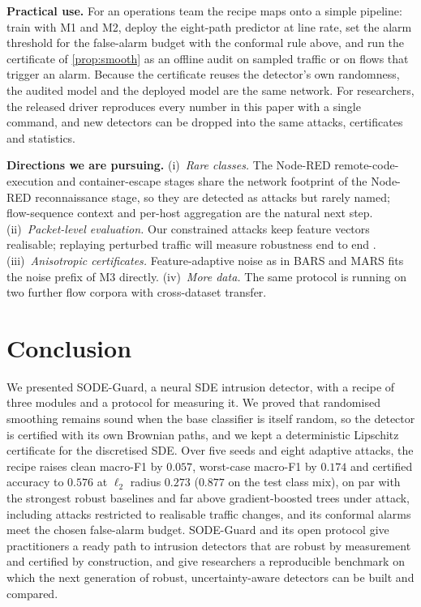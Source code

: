 \documentclass{article}
\theoremstyle{definition}
\begin{document}
\textbf{Practical use.} For an operations team the recipe maps onto a simple
pipeline: train with M1 and M2, deploy the eight-path predictor at line rate,
set the alarm threshold for the false-alarm budget with the conformal rule
above, and run the certificate of \cref{prop:smooth} as an offline audit on
sampled traffic or on flows that trigger an alarm. Because the certificate reuses the
detector's own randomness, the audited model and the deployed model are the
same network. For researchers, the released driver reproduces every number in
this paper with a single command, and new detectors can be dropped into the
same attacks, certificates and statistics.

\textbf{Directions we are pursuing.}
(i)~\emph{Rare classes.} The Node-RED remote-code-execution and container-escape
stages share the network footprint of the Node-RED reconnaissance stage, so they
are detected as attacks but rarely named; flow-sequence context and per-host
aggregation are the natural next step.
(ii)~\emph{Packet-level evaluation.} Our constrained attacks keep feature vectors
realisable; replaying perturbed traffic will measure robustness end to end
\citep{simonetto2024tabularbench}.
(iii)~\emph{Anisotropic certificates.} Feature-adaptive noise as in BARS and MARS
\citep{wang2023bars,huang2025mars} fits the noise prefix of M3 directly.
(iv)~\emph{More data.} The same protocol is running on two further flow corpora
with cross-dataset transfer.

\section{Conclusion}\label{sec:conc}
We presented SODE-Guard, a neural SDE intrusion detector, with a recipe of
three modules and a protocol for measuring it. We proved that randomised
smoothing remains sound when the base classifier is itself random, so the
detector is certified with its own Brownian paths, and we kept a deterministic
Lipschitz certificate for the discretised SDE. Over five seeds and eight
adaptive attacks, the recipe raises clean macro-F1 by $0.057$, worst-case
macro-F1 by $0.174$ and certified accuracy to $0.576$ at $\ell_2$ radius $0.273$
($0.877$ on the test class mix), on par with the strongest robust baselines and
far above gradient-boosted trees under attack, including attacks restricted to
realisable traffic changes, and its conformal alarms meet the chosen
false-alarm budget. SODE-Guard and its open protocol
give practitioners a ready path to intrusion detectors that are robust by
measurement and certified by construction, and give researchers a reproducible
benchmark on which the next generation of robust, uncertainty-aware detectors
can be built and compared.
\end{document}
